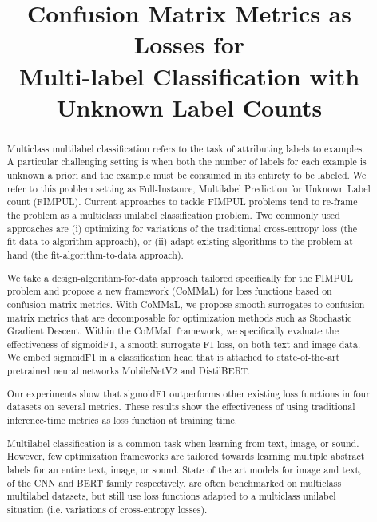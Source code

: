\documentclass[sigconf,natbib,screen=true,review=true,anonymous]{acmart}
\begin{document}
\title[Confusion Matrix Metrics as Losses for Multi-label Classification]{Confusion Matrix Metrics as Losses for \\ Multi-label Classification with Unknown Label Counts}


\begin{abstract}

Multiclass multilabel classification refers to the task of attributing labels to examples. A particular challenging setting is when both the number of labels for each example is unknown a priori and the example must be consumed in its entirety to be labeled. We refer to this problem setting as Full-Instance, Multilabel Prediction for Unknown Label count (FIMPUL). Current approaches to tackle FIMPUL problems tend to re-frame the problem as a multiclass unilabel classification problem. Two commonly used approaches are (i) optimizing for variations of the traditional cross-entropy loss (the fit-data-to-algorithm approach), or (ii) adapt existing algorithms to the problem at hand (the fit-algorithm-to-data approach).

We take a design-algorithm-for-data approach tailored specifically for the FIMPUL problem and propose a new framework (CoMMaL) for loss functions based on confusion matrix metrics. With CoMMaL, we propose smooth surrogates to confusion matrix metrics that are decomposable for optimization methods such as Stochastic Gradient Descent. Within the CoMMaL framework, we specifically evaluate the effectiveness of sigmoidF1, a smooth surrogate F1 loss, on both text and image data. We embed sigmoidF1 in a classification head that is attached to state-of-the-art pretrained neural networks MobileNetV2 and DistilBERT.

Our experiments show that sigmoidF1 outperforms other existing loss functions in four datasets on several metrics. These results show the effectiveness of using traditional inference-time metrics as loss function at training time.

Multilabel classification is a common task when learning from text, image, or sound. However, few optimization frameworks are tailored towards learning multiple abstract labels for an entire text, image, or sound. State of the art models for image and text, of the CNN and BERT family respectively, are often benchmarked on multiclass multilabel datasets, but still use loss functions adapted to a multiclass unilabel situation (i.e. variations of cross-entropy losses).


\end{abstract}
\end{document}
